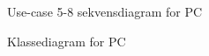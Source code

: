 \begin{figure}[!htb]
     \caption{Use-case 5-8 sekvensdiagram for PC}
     \label{fig:PC_SD2}
\end{figure}

\begin{figure}[!htb]
     \caption{Klassediagram for PC}
     \label{fig:PC_Class}
\end{figure}
